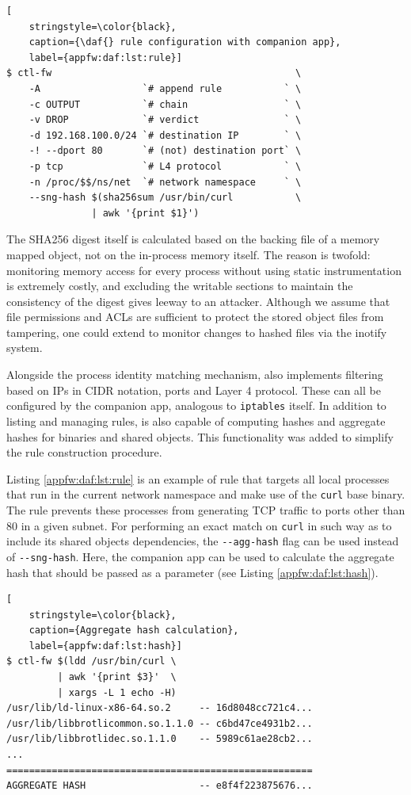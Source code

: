\begin{lstlisting}[
    stringstyle=\color{black},
    caption={\daf{} rule configuration with companion app},
    label={appfw:daf:lst:rule}]
$ ctl-fw                                           \
    -A                  `# append rule           ` \
    -c OUTPUT           `# chain                 ` \
    -v DROP             `# verdict               ` \
    -d 192.168.100.0/24 `# destination IP        ` \
    -! --dport 80       `# (not) destination port` \
    -p tcp              `# L4 protocol           ` \
    -n /proc/$$/ns/net  `# network namespace     ` \
    --sng-hash $(sha256sum /usr/bin/curl           \
               | awk '{print $1}')
\end{lstlisting}

The SHA256 digest itself is calculated based on the backing file of a memory mapped object, not on the in-process memory itself. The reason is twofold: monitoring memory access for every process without using static instrumentation is extremely costly, and excluding the writable sections to maintain the consistency of the digest gives leeway to an attacker. Although we assume that file permissions and ACLs are sufficient to protect the stored object files from tampering, one could extend \daf{} to monitor changes to hashed files via the inotify system.

Alongside the process identity matching mechanism, \daf{} also implements filtering based on IPs in CIDR notation, ports and Layer 4 protocol. These can all be configured by the \daf{} companion app, analogous to \texttt{iptables} itself. In addition to listing and managing rules, \daf{} is also capable of computing hashes and aggregate hashes for binaries and shared objects. This functionality was added to simplify the rule construction procedure.

Listing \ref{appfw:daf:lst:rule} is an example of \daf{} rule that targets all local processes that run in the current network namespace and make use of the \texttt{curl} base binary. The rule prevents these processes from generating TCP traffic to ports other than 80 in a given subnet. For performing an exact match on \texttt{curl} in such way as to include its shared objects dependencies, the \texttt{-{}-agg-hash} flag can be used instead of \texttt{-{}-sng-hash}. Here, the companion app can be used to calculate the aggregate hash that should be passed as a parameter (see Listing \ref{appfw:daf:lst:hash}).

\begin{lstlisting}[
    stringstyle=\color{black},
    caption={Aggregate hash calculation},
    label={appfw:daf:lst:hash}]
$ ctl-fw $(ldd /usr/bin/curl \
         | awk '{print $3}'  \
         | xargs -L 1 echo -H)
/usr/lib/ld-linux-x86-64.so.2     -- 16d8048cc721c4...
/usr/lib/libbrotlicommon.so.1.1.0 -- c6bd47ce4931b2...
/usr/lib/libbrotlidec.so.1.1.0    -- 5989c61ae28cb2...
...
======================================================
AGGREGATE HASH                    -- e8f4f223875676...
\end{lstlisting}


